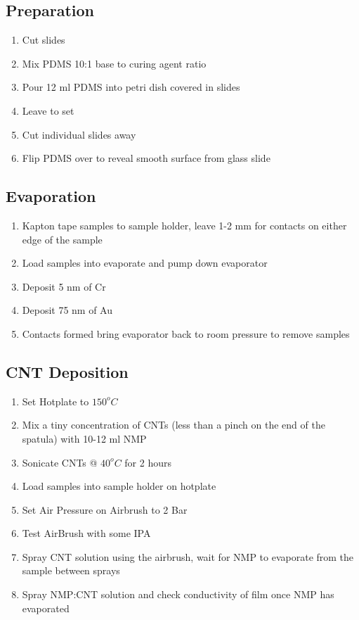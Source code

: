 \documentclass[11pt,twoside,a4paper]{article}
\begin{document}
		\subsection{Preparation}
			\begin{enumerate}
				\item Cut slides
				\item Mix PDMS 10:1 base to curing agent ratio
				\item Pour 12 ml PDMS into petri dish covered in slides
				\item Leave to set
				\item Cut individual slides away
				\item Flip PDMS over to reveal smooth surface from glass slide
			\end{enumerate}
		\subsection{Evaporation}
			\begin{enumerate}
				\item Kapton tape samples to sample holder, leave 1-2 mm for contacts on either edge of the sample
				\item Load samples into evaporate and pump down evaporator
				\item Deposit 5 nm of Cr
				\item Deposit 75 nm of Au
				\item Contacts formed bring evaporator back to room pressure to remove samples
			\end{enumerate}
		\subsection{CNT Deposition}
			\begin{enumerate}
				\item Set Hotplate to $150^oC$
				\item Mix a tiny concentration of CNTs (less than a pinch on the end of the spatula) with 10-12 ml NMP
				\item Sonicate CNTs @ $40^oC$ for 2 hours
				\item Load samples into sample holder on hotplate
				\item Set Air Pressure on Airbrush to 2 Bar
				\item Test AirBrush with some IPA
				\item Spray CNT solution using the airbrush, wait for NMP to evaporate from the sample between sprays
				\item Spray NMP:CNT solution and check conductivity of film once NMP has evaporated
			\end{enumerate}
\end{document}
